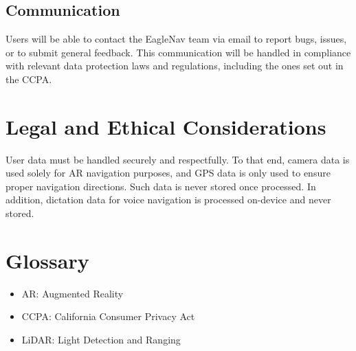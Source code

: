 \documentclass{article}
\begin{document}
\subsection{Communication}
Users will be able to contact the EagleNav team via email to report bugs, issues, or to submit general feedback. This communication will be handled in compliance with relevant data protection laws and regulations, including the ones set out in the CCPA.

\newpage
\section{Legal and Ethical Considerations}
User data must be handled securely and respectfully. To that end, camera data is used solely for AR navigation purposes, and GPS data is only used to ensure proper navigation directions. Such data is never stored once processed. In addition, dictation data for voice navigation is processed on-device and never stored.

\section{Glossary}
\begin{itemize}
\item AR: Augmented Reality
\item CCPA: California Consumer Privacy Act
\item LiDAR: Light Detection and Ranging
\end{itemize}
\end{document}
